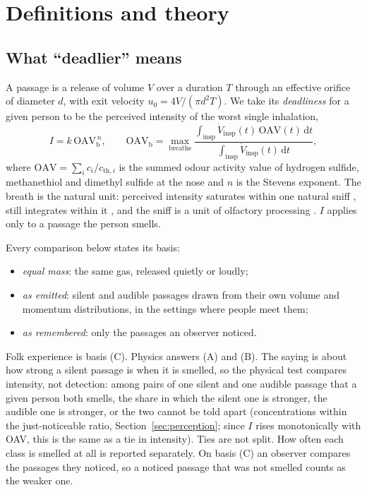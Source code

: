 \section{Definitions and theory}
\label{sec:theory}

\subsection{What ``deadlier'' means}
\label{sec:deadliness}
A passage is a release of volume $V$ over a duration $T$ through an effective orifice of diameter $d$, with exit
velocity $u_0 = 4V/(\pi d^2 T)$. We take its \emph{deadliness} for a given person to be the perceived intensity of the
worst single inhalation,
\begin{equation}
  I = k\,\mathrm{OAV}_\mathrm{b}^{\,n},
  \qquad
  \mathrm{OAV}_\mathrm{b} = \max_{\text{breaths}}
  \frac{\int_\mathrm{insp} \dot V_\mathrm{insp}(t)\,\mathrm{OAV}(t)\,\mathrm{d}t}{\int_\mathrm{insp} \dot V_\mathrm{insp}(t)\,\mathrm{d}t},
  \label{eq:deadliness}
\end{equation}
where $\mathrm{OAV} = \sum_i c_i/c_{\mathrm{th},i}$ is the summed odour activity value of hydrogen sulfide,
methanethiol and dimethyl sulfide at the nose and $n$ is the Stevens exponent. The breath is the natural unit:
perceived intensity saturates within one natural sniff \cite{laing1983}, still integrates within it
\cite{frasnelli2006}, and the sniff is a unit of olfactory processing \cite{kepecs2006}. $I$ applies only to a
passage the person smells.

Every comparison below states its basis:
\begin{itemize}
  \item[(A)] \emph{equal mass}: the same gas, released quietly or loudly;
  \item[(B)] \emph{as emitted}: silent and audible passages drawn from their own volume and momentum distributions,
  in the settings where people meet them;
  \item[(C)] \emph{as remembered}: only the passages an observer noticed.
\end{itemize}
Folk experience is basis (C). Physics answers (A) and (B). The saying is about how strong a silent passage is when it
is smelled, so the physical test compares intensity, not detection: among pairs of one silent and one audible
passage that a given person both smells, the share in which the silent one is stronger, the audible one is stronger,
or the two cannot be told apart (concentrations within the just-noticeable ratio, Section~\ref{sec:perception};
since $I$ rises monotonically with OAV, this is the same as a tie in intensity). Ties are not split. How often each
class is smelled at all is reported separately. On basis (C) an observer compares the passages they noticed, so a
noticed passage that was not smelled counts as the weaker one.

